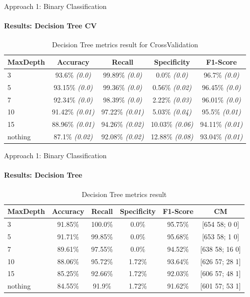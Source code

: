 \documentclass[9pt, pstricks, xcolor=dvipsnames]{beamer}
\begin{document}
\begin{frame}{Approach 1: Binary Classification}
\framesubtitle{Results: Decision Tree CV}
\begin{table}[H]
    \centering
    \begin{tabular}{lcccc}
        \toprule
        MaxDepth & Accuracy & Recall & Specificity & F1-Score  \\
        \midrule
        3 & 93.6\% \textit{(0.0)} & 99.89\% \textit{(0.0)} & 0.0\% \textit{(0.0)} & 96.7\% \textit{(0.0)} \\
        5 & 93.15\% \textit{(0.0)} & 99.36\% \textit{(0.0)} & 0.56\% \textit{(0.02)} & 96.45\% \textit{(0.0)} \\
        7 & 92.34\% \textit{(0.0)} & 98.39\% \textit{(0.0)} & 2.22\% \textit{(0.03)} & 96.01\% \textit{(0.0)} \\
        10 & 91.42\% \textit{(0.01)} & 97.22\% \textit{(0.01)} & 5.03\% \textit{(0.04)} & 95.5\% \textit{(0.01)} \\
        15 & 88.96\% \textit{(0.01)} & 94.26\% \textit{(0.02)} & 10.03\% \textit{(0.06)} & 94.11\% \textit{(0.01)} \\
        nothing & 87.1\% \textit{(0.02)} & 92.08\% \textit{(0.02)} & 12.88\% \textit{(0.08)} & 93.04\% \textit{(0.01)} \\

        \bottomrule
    \end{tabular}
    \caption{Decision Tree metrics result for CrossValidation}
    \label{tab:DT_CV_approach1}
\end{table}
\end{frame}
\begin{frame}{Approach 1: Binary Classification}
\framesubtitle{Results: Decision Tree}
\begin{table}[H]
    \centering
    \begin{tabular}{lccccc}
        \toprule
        MaxDepth & Accuracy & Recall & Specificity & F1-Score & CM \\
        \midrule
        3 & 91.85\%  & 100.0\%  & 0.0\%  & 95.75\% & [654 58; 0 0] \\
        5 & 91.71\%  & 99.85\%  & 0.0\%  & 95.68\% & [653 58; 1 0] \\
        7 & 89.61\%  & 97.55\%  & 0.0\%  & 94.52\% & [638 58; 16 0] \\
        10 & 88.06\%  & 95.72\%  & 1.72\%  & 93.64\% & [626 57; 28 1] \\
        15 & 85.25\%  & 92.66\%  & 1.72\%  & 92.03\% & [606 57; 48 1] \\
        nothing & 84.55\%  & 91.9\%  & 1.72\%  & 91.62\% & [601 57; 53 1] \\
        \bottomrule
    \end{tabular}
    \caption{Decision Tree metrics result}
    \label{tab:dt_approach1}
\end{table}
\end{frame}
\end{document}
